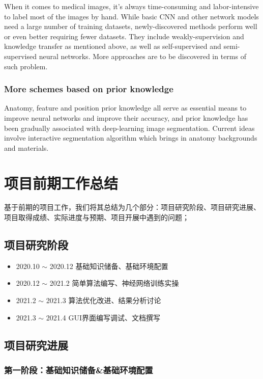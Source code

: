 \documentclass[lang=cn,11pt,a4paper,cite=numbers]{elegantpaper}
\begin{document}
When it comes to medical images, it’s always time-consuming and labor-intensive to label most of the images by hand. While basic CNN and other network models need a large number of training datasets, newly-discovered methods perform well or even better requiring fewer datasets. They include weakly-supervision and knowledge transfer as mentioned above, as well as self-supervised and semi-supervised neural networks. More approaches are to be discovered in terms of such problem.

\subsubsection{More schemes based on prior knowledge}

Anatomy, feature and position prior knowledge all serve as essential means to improve neural networks and improve their accuracy, and prior knowledge has been gradually associated with deep-learning image segmentation. Current ideas involve interactive segmentation algorithm which brings in anatomy backgrounds and materials. 

\section{项目前期工作总结}

基于前期的项目工作，我们将其总结为几个部分：项目研究阶段、项目研究进展、项目取得成绩、实际进度与预期、项目开展中遇到的问题；

\subsection{项目研究阶段}

\begin{itemize}
    \item 2020.10 $\sim$ 2020.12 基础知识储备、基础环境配置
    \item 2020.12 $\sim$ 2021.2 简单算法编写、神经网络训练实操
    \item 2021.2 $\sim$ 2021.3 算法优化改进、结果分析讨论
    \item 2021.3 $\sim$ 2021.4 GUI界面编写调试、文档撰写
\end{itemize}

\subsection{项目研究进展}

\subsubsection{第一阶段：基础知识储备\&基础环境配置}
\end{document}
